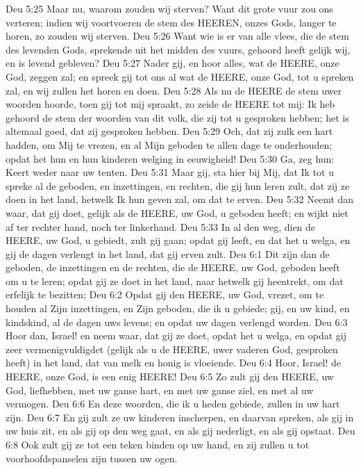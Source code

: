 Deu 5:25  Maar nu, waarom zouden wij sterven? Want dit grote vuur zou ons verteren; indien wij voortvoeren de stem des HEEREN, onzes Gods, langer te horen, zo zouden wij sterven.
Deu 5:26  Want wie is er van alle vlees, die de stem des levenden Gods, sprekende uit het midden des vuurs, gehoord heeft gelijk wij, en is levend gebleven?
Deu 5:27  Nader gij, en hoor alles, wat de HEERE, onze God, zeggen zal; en spreek gij tot ons al wat de HEERE, onze God, tot u spreken zal, en wij zullen het horen en doen.
Deu 5:28  Als nu de HEERE de stem uwer woorden hoorde, toen gij tot mij spraakt, zo zeide de HEERE tot mij: Ik heb gehoord de stem der woorden van dit volk, die zij tot u gesproken hebben; het is altemaal goed, dat zij gesproken hebben.
Deu 5:29  Och, dat zij zulk een hart hadden, om Mij te vrezen, en al Mijn geboden te allen dage te onderhouden; opdat het hun en hun kinderen welging in eeuwigheid!
Deu 5:30  Ga, zeg hun: Keert weder naar uw tenten.
Deu 5:31  Maar gij, sta hier bij Mij, dat Ik tot u spreke al de geboden, en inzettingen, en rechten, die gij hun leren zult, dat zij ze doen in het land, hetwelk Ik hun geven zal, om dat te erven.
Deu 5:32  Neemt dan waar, dat gij doet, gelijk als de HEERE, uw God, u geboden heeft; en wijkt niet af ter rechter hand, noch ter linkerhand.
Deu 5:33  In al den weg, dien de HEERE, uw God, u gebiedt, zult gij gaan; opdat gij leeft, en dat het u welga, en gij de dagen verlengt in het land, dat gij erven zult.
Deu 6:1  Dit zijn dan de geboden, de inzettingen en de rechten, die de HEERE, uw God, geboden heeft om u te leren; opdat gij ze doet in het land, naar hetwelk gij heentrekt, om dat erfelijk te bezitten;
Deu 6:2  Opdat gij den HEERE, uw God, vrezet, om te houden al Zijn inzettingen, en Zijn geboden, die ik u gebiede; gij, en uw kind, en kindskind, al de dagen uws levens; en opdat uw dagen verlengd worden.
Deu 6:3  Hoor dan, Israel! en neem waar, dat gij ze doet, opdat het u welga, en opdat gij zeer vermenigvuldigdet (gelijk als u de HEERE, uwer vaderen God, gesproken heeft) in het land, dat van melk en honig is vloeiende.
Deu 6:4  Hoor, Israel! de HEERE, onze God, is een enig HEERE!
Deu 6:5  Zo zult gij den HEERE, uw God, liefhebben, met uw ganse hart, en met uw ganse ziel, en met al uw vermogen.
Deu 6:6  En deze woorden, die ik u heden gebiede, zullen in uw hart zijn.
Deu 6:7  En gij zult ze uw kinderen inscherpen, en daarvan spreken, als gij in uw huis zit, en als gij op den weg gaat, en als gij nederligt, en als gij opstaat.
Deu 6:8  Ook zult gij ze tot een teken binden op uw hand, en zij zullen u tot voorhoofdspanselen zijn tussen uw ogen.
